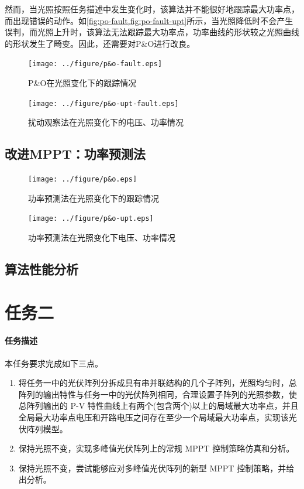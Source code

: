 \documentclass[a4paper,12pt]{article}
\begin{document}
    然而，当光照按照任务描述中发生变化时，该算法并不能很好地跟踪最大功率点，而出现错误的动作。如\cref{fig:po-fault,fig:po-fault-upt}所示，当光照降低时不会产生误判，而光照上升时，该算法无法跟踪最大功率点，功率曲线的形状较之光照曲线的形状发生了畸变。因此，还需要对P\&O进行改良。

    \begin{figure}[htbp]
        \centering
        \texttt{[image: ../figure/p\&o-fault.eps]}
        \caption{P\&O在光照变化下的跟踪情况}
        \label{fig:po-fault}
    \end{figure}
    \begin{figure}[htbp]
        \centering
        \texttt{[image: ../figure/p\&o-upt-fault.eps]}
        \caption{扰动观察法在光照变化下的电压、功率情况}
        \label{fig:po-fault-upt}
    \end{figure}
    \subsection{改进MPPT：功率预测法} %
    \label{sub:改进mppt_功率预测法}

    \begin{figure}[htbp]
        \centering
        \texttt{[image: ../figure/p\&o.eps]}
        \caption{功率预测法在光照变化下的跟踪情况}
        \label{fig:po}
    \end{figure}
    \begin{figure}[htbp]
        \centering
        \texttt{[image: ../figure/p\&o-upt.eps]}
        \caption{功率预测法在光照变化下电压、功率情况}
        \label{fig:po-upt}
    \end{figure}
    \subsection{算法性能分析} %
    \label{sub:算法性能分析}
    
    \section{任务二} %
    \label{sec:任务二}
    \paragraph{任务描述} %
    本任务要求完成如下三点。
    \begin{enumerate}[noitemsep,topsep=0pt]
    \item 将任务一中的光伏阵列分拆成具有串并联结构的几个子阵列，光照均匀时，总阵列的输出特性与任务一中的光伏阵列相同，合理设置子阵列的光照参数，使总阵列输出的 P-V 特性曲线上有两个(包含两个)以上的局域最大功率点，并且全局最大功率点电压和开路电压之间存在至少一个局域最大功率点，实现该光伏阵列模型。
    \item 保持光照不变，实现多峰值光伏阵列上的常规 MPPT 控制策略仿真和分析。
    \item 保持光照不变，尝试能够应对多峰值光伏阵列的新型 MPPT 控制策略，并给出分析。
    \end{enumerate}    
\end{document}
